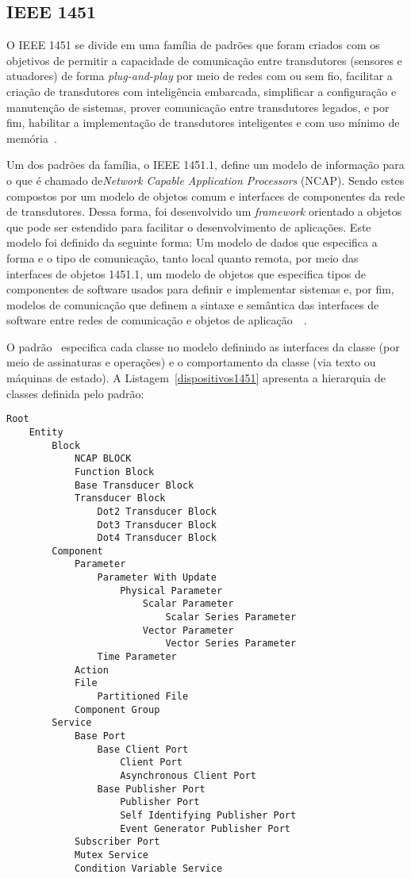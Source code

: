 \subsection{IEEE 1451}
O IEEE 1451 se divide em uma família de padrões que foram criados com os objetivos de permitir a capacidade de comunicação entre transdutores (sensores e atuadores) de forma \emph{plug-and-play} por meio de redes com ou sem fio, facilitar a criação de transdutores com inteligência embarcada, simplificar a configuração e manutenção de sistemas, prover comunicação entre transdutores legados, e por fim, habilitar a implementação de transdutores inteligentes e com uso mínimo de memória~\cite{ieee1451journal}.

Um dos padrões da família, o IEEE 1451.1, define um modelo de informação para o que é chamado de\emph{Network Capable Application Processors} (NCAP). Sendo estes compostos  por um modelo de objetos comum e interfaces de componentes da rede de transdutores. Dessa forma, foi desenvolvido um \emph{framework} orientado a objetos que pode ser estendido para facilitar o desenvolvimento de aplicações. Este modelo foi definido da seguinte forma: Um modelo de dados que especifica a forma e o tipo de comunicação, tanto local quanto remota, por meio das interfaces de objetos 1451.1, um modelo de objetos que especifica tipos de componentes de software usados para definir e implementar sistemas e, por fim, modelos de comunicação que definem a sintaxe e semântica das interfaces de software entre redes de comunicação e objetos de aplicação~\cite{ieeeOO1451}~\cite{ieee1451monitoring}.

O padrão~\cite{ieee1451standard} especifica cada classe no modelo definindo as interfaces da classe (por meio de assinaturas e operações) e o comportamento da classe (via texto ou máquinas de estado). A Listagem~\ref{dispositivos1451} apresenta a hierarquia de classes definida pelo padrão:

\newpage

\begin{lstlisting}[frame=single]
Root
	Entity
		Block
			NCAP BLOCK
			Function Block
			Base Transducer Block
			Transducer Block
				Dot2 Transducer Block
				Dot3 Transducer Block
				Dot4 Transducer Block
		Component
			Parameter
				Parameter With Update
					Physical Parameter
						Scalar Parameter
							Scalar Series Parameter
						Vector Parameter
							Vector Series Parameter
				Time Parameter
			Action
			File
				Partitioned File
			Component Group
		Service
			Base Port
				Base Client Port
					Client Port
					Asynchronous Client Port
				Base Publisher Port
					Publisher Port
					Self Identifying Publisher Port
					Event Generator Publisher Port
			Subscriber Port
			Mutex Service
			Condition Variable Service
\end{lstlisting}

